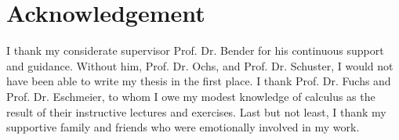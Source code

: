 \chapter*{Acknowledgement}

I thank my considerate supervisor Prof. Dr. Bender for his continuous support and guidance. Without him, Prof. Dr. Ochs, and Prof. Dr. Schuster, I would not have been able to write my thesis in the first place. I thank Prof. Dr. Fuchs and Prof. Dr. Eschmeier, to whom I owe my modest knowledge of calculus as the result of their instructive lectures and exercises. Last but not least, I thank my supportive family and friends who were emotionally involved in my work.